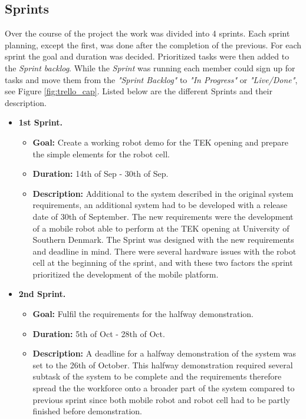 \subsection{Sprints} \label{sec:sprints}
Over the course of the project the work was divided into 4 sprints. Each sprint planning, except the first, was done after the completion of the previous. For each sprint the goal and duration was decided. Prioritized tasks were then added to the \emph{Sprint backlog}. While the \emph{Sprint} was running each member could sign up for tasks and move them from the \emph{"Sprint Backlog"} to \emph{"In Progress"} or \emph{"Live/Done"}, see Figure \ref{fig:trello_cap}. 
Listed below are the different Sprints and their description.

\begin{itemize}
    \item \textbf{1st Sprint.}
    \begin{itemize}
    	\item \textbf{Goal:} Create a working robot demo for the TEK opening and prepare the simple elements for the robot cell.
    	\item \textbf{Duration:} 14th of Sep - 30th of Sep.
    	\item \textbf{Description:} Additional to the system described in the original system requirements, an additional system had to be developed with a release date of 30th of September. The new requirements were the development of a mobile robot able to perform at the TEK opening at University of Southern Denmark. The Sprint was designed with the new requirements and deadline in mind. There were several hardware issues with the robot cell at the beginning of the sprint, and with these two factors the sprint prioritized the development of the mobile platform.
	\end{itemize}
	
    \item \textbf{2nd Sprint.}
    \begin{itemize}
    	\item \textbf{Goal:} Fulfil the requirements for the halfway demonstration.
    	\item \textbf{Duration:} 5th of Oct - 28th of Oct.
    	\item \textbf{Description:} A deadline for a halfway demonstration of the system was set to the 26th of October. This halfway demonstration required several subtask of the system to be complete and the requirements therefore spread the the workforce onto a broader part of the system compared to previous sprint since both mobile robot and robot cell had to be partly finished before demonstration.
	\end{itemize}
	

\end{itemize}
